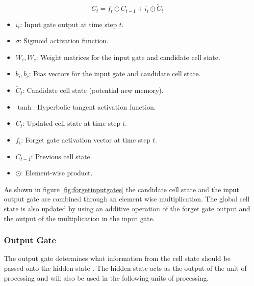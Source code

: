 \[
C_t = f_t \odot C_{t-1} + i_t \odot \tilde{C}_t
\label{eqn:cellupdate}
\]
{\small
\begin{itemize}
	\item $i_t$: Input gate output at time step $t$.
	\item $\sigma$: Sigmoid activation function.
	\item $W_i, W_c$: Weight matrices for the input gate and candidate cell state.

	\item $b_i, b_c$: Bias vectors for the input gate and candidate cell state.
	\item $\tilde{C}_t$: Candidate cell state (potential new memory).
	\item $\tanh$: Hyperbolic tangent activation function.
	\item $C_t$: Updated cell state at time step $t$.
	\item $f_t$: Forget gate activation vector at time step $t$.
	\item $C_{t-1}$: Previous cell state.
	\item $\odot$: Element-wise product.
\end{itemize}
}
As shown in figure \ref{fig:forgetinputgates} the candidate cell state and the input output gate are combined through an element wise multiplication. The global cell state is also updated by using an additive operation of the forget gate output and the output of the multiplication in the input gate.
\subsubsection{Output Gate}
The output gate determines what information from the cell state should be passed onto the hidden state \cite{zhu2025novel}. The hidden state acts as the output of the unit of processing and will also be used in the following units of processing.
 
